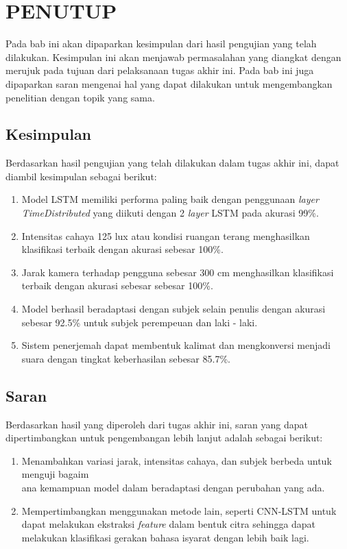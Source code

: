 \chapter{PENUTUP}
\label{chap:penutup}

Pada bab ini akan dipaparkan kesimpulan dari hasil pengujian yang telah dilakukan. Kesimpulan ini akan menjawab permasalahan yang diangkat dengan merujuk pada tujuan dari pelaksanaan tugas akhir ini. Pada bab ini juga dipaparkan saran mengenai hal yang dapat dilakukan untuk mengembangkan penelitian dengan topik yang sama.

\section{Kesimpulan}
\label{sec:kesimpulan}

Berdasarkan hasil pengujian yang telah dilakukan dalam tugas akhir ini, dapat diambil kesimpulan sebagai berikut:

\begin{enumerate}[nolistsep]

  \item Model LSTM memiliki performa paling baik dengan penggunaan \emph{layer TimeDistributed} yang diikuti dengan 2 \emph{layer} LSTM pada akurasi 99\%.
  \item Intensitas cahaya 125 lux atau kondisi ruangan terang menghasilkan klasifikasi terbaik dengan akurasi sebesar 100\%.
  \item Jarak kamera terhadap pengguna sebesar 300 cm menghasilkan klasifikasi terbaik dengan akurasi sebesar sebesar 100\%.
  \item Model berhasil beradaptasi dengan subjek selain penulis dengan akurasi sebesar 92.5\% untuk subjek perempeuan dan laki - laki.
  \item Sistem penerjemah dapat membentuk kalimat dan mengkonversi menjadi suara dengan tingkat keberhasilan sebesar 85.7\%.


\end{enumerate}

\section{Saran}
\label{chap:saran}

Berdasarkan hasil yang diperoleh dari tugas akhir ini, saran yang dapat dipertimbangkan untuk pengembangan lebih lanjut adalah sebagai berikut:

\begin{enumerate}[nolistsep]

  \item Menambahkan variasi jarak, intensitas cahaya, dan subjek berbeda untuk menguji bagaim\\ana kemampuan model dalam beradaptasi dengan perubahan yang ada.
  \item Mempertimbangkan menggunakan metode lain, seperti CNN-LSTM untuk dapat melakukan ekstraksi \emph{feature} dalam bentuk citra sehingga dapat melakukan klasifikasi gerakan bahasa isyarat dengan lebih baik lagi.

\end{enumerate}
